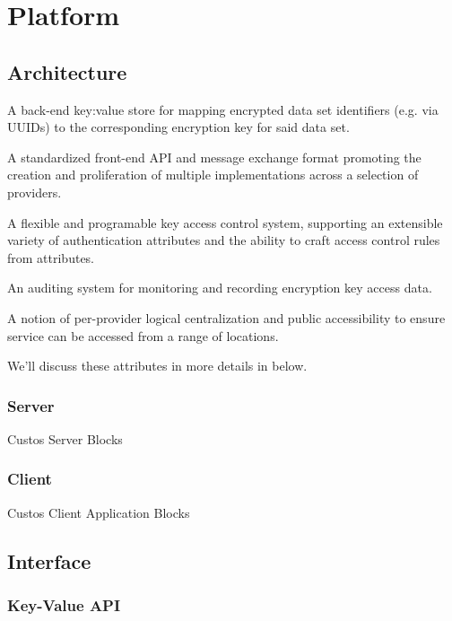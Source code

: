 \chapter{Platform}
\label{chap:platform}

\section{Architecture}

\begin{packed_item}
\item A back-end key:value store for mapping encrypted data set
  identifiers (e.g. via UUIDs) to the corresponding encryption key for
  said data set.
\item A standardized front-end API and message exchange format
  promoting the creation and proliferation of multiple implementations
  across a selection of providers.
\item A flexible and programable key access control system, supporting
  an extensible variety of authentication attributes and the ability
  to craft access control rules from attributes.
\item An auditing system for monitoring and recording
  encryption key access data.
\item A notion of per-provider logical centralization and public
  accessibility to ensure service can be accessed from a range of
  locations.
\end{packed_item}

We'll discuss these attributes in more details in below.

\subsection{Server}

Custos Server Blocks

\subsection{Client}

Custos Client Application Blocks

\section{Interface}

\subsection{Key-Value API}

